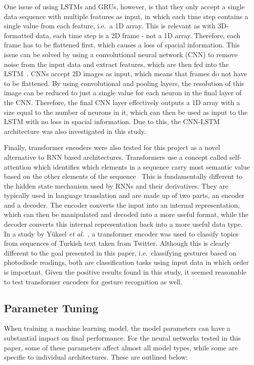 One issue of using LSTMs and GRUs, however, is that they only accept a single data sequence with multiple features as input, in which each time step contains a single value from each feature, i.e.\ a 1D array.
This is relevant as with 3D-formatted data, each time step is a 2D frame - not a 1D array.
Therefore, each frame has to be flattened first, which causes a loss of spacial information.
This issue can be solved by using a convolutional neural network (CNN) to remove noise from the input data and extract features, which are then fed into the LSTM~\cite{KIM201972}.
CNNs accept 2D images as input, which means that frames do not have to be flattened.
By using convolutional and pooling layers, the resolution of this image can be reduced to just a single value for each neuron in the final layer of the CNN\@.
Therefore, the final CNN layer effectively outputs a 1D array with a size equal to the number of neurons in it, which can then be used as input to the LSTM with no loss in spacial information.
Due to this, the CNN-LSTM architecture was also investigated in this study.

Finally, transformer encoders were also tested for this project as a novel alternative to RNN based architectures.
Transformers use a concept called self-attention which identifies which elements in a sequence carry most semantic value based on the other elements of the sequence~\cite{https://doi.org/10.48550/arxiv.1706.03762}
This is fundamentally different to the hidden state mechanism used by RNNs and their derivatives.
They are typically used in language translation and are made up of two parts, an encoder and a decoder.
The encoder converts the input into an internal representation, which can then be manipulated and decoded into a more useful format, while the decoder converts this internal representation back into a more useful data type.
In a study by Y{\"u}ksel \textit{et al.}~\cite{yuksel-etal-2019-turkish}, a transformer encoder was used to classify topics from sequences of Turkish text taken from Twitter.
Although this is clearly different to the goal presented in this paper, i.e.\ classifying gestures based on photodiode readings, both are classification tasks using input data in which order is important.
Given the positive results found in this study, it seemed reasonable to test transformer encoders for gesture recognition as well.

\subsection{Parameter Tuning}\label{subsec:frame-size}
When training a machine learning model, the model parameters can have a substantial impact on final performance.
For the neural networks tested in this paper, some of these parameters affect almost all model types, while some are specific to individual architectures.
These are outlined below:

